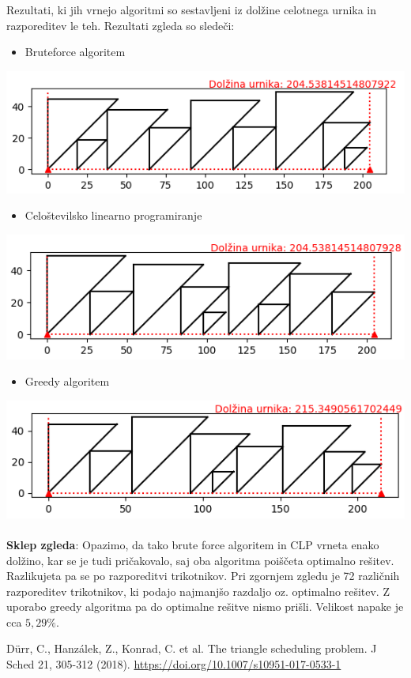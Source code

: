 \documentclass[a4paper,12pt]{article}
\theoremstyle{definition}
\theoremstyle{plain}
\begin{document}
Rezultati, ki jih vrnejo algoritmi so sestavljeni iz dolžine celotnega urnika in razporeditev le teh. Rezultati
zgleda so sledeči:
\begin{itemize}
    \item Bruteforce algoritem
\end{itemize}    
    \includegraphics[]{sim_brut.png}
    \begin{itemize}
    \item Celoštevilsko linearno programiranje
\end{itemize}    
    \includegraphics[]{sim_clp.png}
    \begin{itemize}
    \item Greedy algoritem
\end{itemize}    
    \includegraphics[]{sim_greedy.png}
\\ \\
\textbf{Sklep zgleda}: Opazimo, da tako brute force algoritem in CLP vrneta enako dolžino,
kar se je tudi pričakovalo, saj oba algoritma poiščeta optimalno rešitev. Razlikujeta pa se po
razporeditvi trikotnikov. Pri zgornjem zgledu je 72 različnih razporeditev trikotnikov, ki podajo najmanjšo
razdaljo oz. optimalno rešitev. Z uporabo greedy algoritma pa do optimalne rešitve nismo
prišli. Velikost napake je cca $5,29\%$.


\begin{thebibliography}{9}
          Dürr, C., Hanzálek, Z., Konrad, C. et al. The triangle scheduling problem. J Sched 21, 305-312 (2018). \href{https://doi.org/10.1007/s10951-017-0533-1}{https://doi.org/10.1007/s10951-017-0533-1 }
\end{thebibliography}
\end{document}
